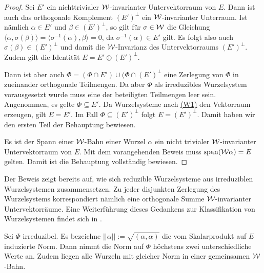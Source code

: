 \begin{proof}
  Sei $E'$ ein nichttrivialer $\mathcal{W}$\hyp{}invarianter Untervektorraum von $E$.
  Dann ist auch das orthogonale Komplement $(E')^\perp$ ein $\mathcal{W}$\hyp{}invarianter Unterraum.
  Ist nämlich $\alpha \in E'$ und $\beta \in (E')^\perp$, so gilt für $\sigma \in \mathcal{W}$ die Gleichung
  $\langle \alpha, \sigma(\beta) \rangle = \langle \sigma^{-1}(\alpha), \beta \rangle = 0$, da $\sigma^{-1}(\alpha) \in E'$ gilt.
  Es folgt also auch $\sigma(\beta) \in (E')^\perp$ und damit die $\mathcal{W}$\hyp{}Invarianz des Untervektorraums $(E')^\perp$. 
  Zudem gilt die Identität $E = E' \oplus (E')^\perp$.

  Dann ist aber auch $\Phi = (\Phi \cap E') \cup (\Phi \cap (E')^\perp$ eine Zerlegung von $\Phi$ in zueinander orthogonale Teilmengen.
  Da aber $\Phi$ als irreduzibles Wurzelsystem vorausgesetzt wurde muss eine der beteiligten Teilmengen leer sein.
  Angenommen, es gelte $\Phi \subseteq E'$. 
  Da Wurzelsysteme nach \hyperref[it:W1]{(W1)} den Vektorraum erzeugen, gilt $E = E'$. 
  Im Fall $\Phi \subseteq (E')^\perp$ folgt $E = (E')^\perp$.
  Damit haben wir den ersten Teil der Behauptung bewiesen.

  Es ist der Spann einer $\mathcal{W}$\hyp{}Bahn einer Wurzel $\alpha$ ein nicht trivialer $\mathcal{W}$\hyp{}invarianter Untervektorraum von $E$.
  Mit dem vorangehenden Beweis muss $\operatorname{span}(\mathcal{W}\alpha) = E$ gelten.
  Damit ist die Behauptung vollständig bewiesen.
\end{proof}

\begin{bem}
  Der Beweis zeigt bereits auf, wie sich reduzible Wurzelsysteme aus irreduziblen Wurzelsystemen zusammensetzen.
  Zu jeder disjunkten Zerlegung des Wurzelsystems korrespondiert nämlich eine orthogonale Summe $\mathcal{W}$\hyp{}invarianter Untervektorräume.
  Eine Weiterführung dieses Gedankens zur Klassifikation von Wurzelsystemen findet sich in \cite[S.57ff.]{humphreys1972introduction}.
\end{bem}

\begin{lem}
  \label{lem:rootLength}
  Sei $\Phi$ irreduzibel.
  Es bezeichne $||\alpha|| := \sqrt{(\alpha,\alpha)}$ die vom Skalarprodukt auf $E$ induzierte Norm.
  Dann nimmt die Norm auf $\Phi$ höchstens zwei unterschiedliche Werte an.
  Zudem liegen alle Wurzeln mit gleicher Norm in einer gemeinsamen $\mathcal{W}$\hyp{}Bahn.
\end{lem}

